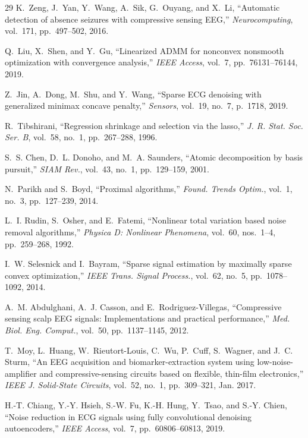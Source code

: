 \documentclass[journal,twoside,10pt]{IEEEtran}
\begin{document}
\begin{thebibliography}{29}
K.~Zeng, J.~Yan, Y.~Wang, A.~Sik, G.~Ouyang, and X.~Li,
``Automatic detection of absence seizures with compressive sensing EEG,''
\emph{Neurocomputing}, vol.~171, pp.~497--502, 2016.

Q.~Liu, X.~Shen, and Y.~Gu,
``Linearized ADMM for nonconvex nonsmooth optimization with convergence analysis,''
\emph{IEEE Access}, vol.~7, pp.~76131--76144, 2019.

Z.~Jin, A.~Dong, M.~Shu, and Y.~Wang,
``Sparse ECG denoising with generalized minimax concave penalty,''
\emph{Sensors}, vol.~19, no.~7, p.~1718, 2019.

R.~Tibshirani,
``Regression shrinkage and selection via the lasso,''
\emph{J. R. Stat. Soc. Ser. B}, vol.~58, no.~1, pp.~267--288, 1996.

S.~S. Chen, D.~L. Donoho, and M.~A. Saunders,
``Atomic decomposition by basis pursuit,''
\emph{SIAM Rev.}, vol.~43, no.~1, pp.~129--159, 2001.

N.~Parikh and S.~Boyd,
``Proximal algorithms,''
\emph{Found. Trends Optim.}, vol.~1, no.~3, pp.~127--239, 2014.

L.~I. Rudin, S.~Osher, and E.~Fatemi,
``Nonlinear total variation based noise removal algorithms,''
\emph{Physica D: Nonlinear Phenomena}, vol.~60, nos.~1--4, pp.~259--268, 1992.

I.~W. Selesnick and I.~Bayram,
``Sparse signal estimation by maximally sparse convex optimization,''
\emph{IEEE Trans. Signal Process.}, vol.~62, no.~5, pp.~1078--1092, 2014.

A.~M. Abdulghani, A.~J. Casson, and E.~Rodriguez-Villegas,
``Compressive sensing scalp EEG signals: Implementations and practical performance,''
\emph{Med. Biol. Eng. Comput.}, vol.~50, pp.~1137--1145, 2012.

T.~Moy, L.~Huang, W.~Rieutort-Louis, C.~Wu, P.~Cuff, S.~Wagner, and J.~C. Sturm,
``An EEG acquisition and biomarker-extraction system using low-noise-amplifier and compressive-sensing
circuits based on flexible, thin-film electronics,''
\emph{IEEE J. Solid-State Circuits}, vol.~52, no.~1, pp.~309--321, Jan. 2017.

H.-T. Chiang, Y.-Y. Hsieh, S.-W. Fu, K.-H. Hung, Y.~Tsao, and S.-Y. Chien,
``Noise reduction in ECG signals using fully convolutional denoising autoencoders,''
\emph{IEEE Access}, vol.~7, pp.~60806--60813, 2019.


\end{thebibliography}
\end{document}
